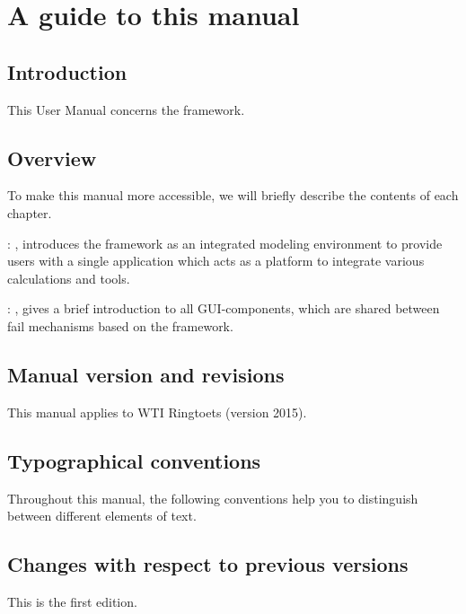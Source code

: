 
\chapter{A guide to this manual\label{chap:guide}}

\section{Introduction}
This User Manual concerns the framework.

\section{Overview}
To make this manual more accessible, we will briefly describe the contents of each chapter.

: , introduces the framework as an integrated modeling environment to provide users with a single application which acts as a platform to integrate various calculations and tools.

: , gives a brief introduction to all GUI-components, which are shared between fail mechanisms based on the framework.

\section{Manual version and revisions}
This manual applies to WTI Ringtoets (version 2015).

\section{Typographical conventions}
Throughout this manual, the following conventions help you to distinguish between different
elements of text.


\section{Changes with respect to previous versions}
This is the first edition.